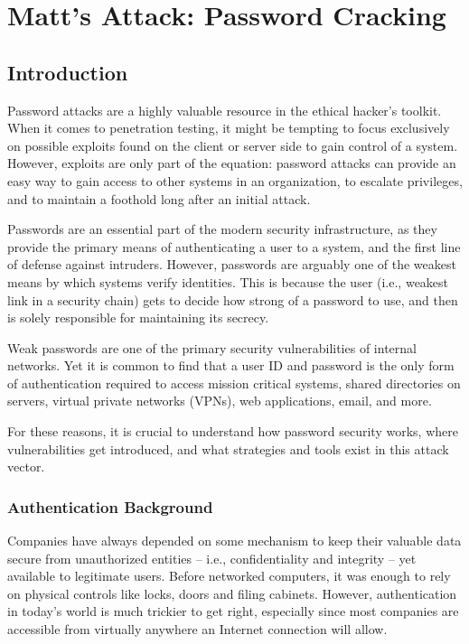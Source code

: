 \section{Matt's Attack: Password Cracking}

\subsection{Introduction}
Password attacks are a highly valuable resource in the ethical hacker’s toolkit. When it comes to penetration testing, it might be tempting to focus exclusively on possible exploits found on the client or server side to gain control of a system. However, exploits are only part of the equation: password attacks can provide an easy way to gain access to other systems in an organization, to escalate privileges, and to maintain a foothold long after an initial attack.

Passwords are an essential part of the modern security infrastructure, as they provide the primary means of authenticating a user to a system, and the first line of defense against intruders. However, passwords are arguably one of the weakest means by which systems verify identities. This is because the user (i.e., weakest link in a security chain) gets to decide how strong of a password to use, and then is solely responsible for maintaining its secrecy.

Weak passwords are one of the primary security vulnerabilities of internal networks. Yet it is common to find that a user ID and password is the only form of authentication required to access mission critical systems, shared directories on servers, virtual private networks (VPNs), web applications, email, and more.

For these reasons, it is crucial to understand how password security works, where vulnerabilities get introduced, and what strategies and tools exist in this attack vector.

\subsubsection{Authentication Background}
Companies have always depended on some mechanism to keep their valuable data secure from unauthorized entities -- i.e., confidentiality and integrity -- yet available to legitimate users. Before networked computers, it was enough to rely on physical controls like locks, doors and filing cabinets. However, authentication in today’s world is much trickier to get right, especially since most companies are accessible from virtually anywhere an Internet connection will allow.

